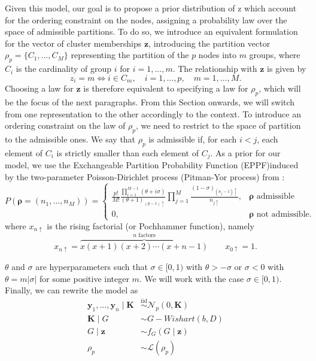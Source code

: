 Given this model, our goal is to propose a prior distribution of z which account for the ordering constraint on the nodes, assigning a probability law over the space of admissible partitions. To do so, we introduce an equivalent formulation for the vector of cluster memberships $\mathbf{z}$, introducing the partition vector $\rho_p=\{C_1,\ldots,C_M\}$ representing the partition of the $p$ nodes into $m$ groups, where $C_i$ is the cardinality of group $i$ for $i=1,...,m$. The relationship with $\mathbf{z}$ is given by 
\[
z_i=m \iff i \in C_m, \quad i=1, \ldots, p, \quad m=1, \ldots, M.
\]
Choosing a law for $\mathbf{z}$ is therefore equivalent to specifying a law for $\rho_p$, which will be the focus of the next paragraphs. From this Section onwards, we will switch from one representation to the other accordingly to the context. To introduce an ordering constraint on the law of $\rho_p$, we need to restrict to the space of partition to the admissible ones.
We say that $\rho_p$ is admissible if, for each $i<j$, each element of $C_i$ is strictly smaller than each element of $C_j$. 
As a prior for our model, we use the Exchangeable Partition Probability Function (EPPF)induced by the two-parameter Poisson-Dirichlet process (Pitman-Yor process) from \textcite[830]{martinezNonparametricChangePoint2014}:
\[
    P(\bm{\rho} = (n_1, \ldots, n_M))
    =
    \begin{cases}
        \frac{p!}{M!} \frac{ \prod_{i=1}^{M-1}{(\theta +i\sigma)} }{(\theta+1)_{(p-1)\uparrow}} \prod_{j=1}^{M}{\frac{(1-\sigma)_{(n_{j}-1)\uparrow}}{n_{j\uparrow}} }, & \bm{\rho} \text{ admissible}\\
                0, & \bm{\rho} \text{ not admissible.}
    \end{cases}
\]
where $x_{n\uparrow}$ is the rising factorial (or Pochhammer function), namely
\begin{equation*}
x_{n\uparrow} = \overbrace{x(x+1)(x+2)\cdots(x+n-1)}^{n\text{ factors}} \qquad x_{0\uparrow}=1.
\end{equation*}

$\theta$ and $\sigma$ are hyperparameters such that $\sigma\in[0,1)$ with $\theta>-\sigma$ or $\sigma<0$ with $\theta=m|\sigma|$ for some positive integer $m$. We will work with the case $\sigma\in[0,1)$.\\

Finally, we can rewrite the model as
 \begin{align*}
    \mathbf{y}_1,\ldots,\mathbf{y}_n \mid \mathbf{K} & \overset{\mathrm{iid}}{\sim} \mathcal{N}_p(0,\mathbf{K}) \\
    \mathbf{K} \mid G & \sim G-Wishart(b,D) \\
    G \mid \mathbf{z} & \sim f_G(G\mid\mathbf{z})\\
    \rho_p & \sim \mathcal{L}(\rho_p)
\end{align*}

